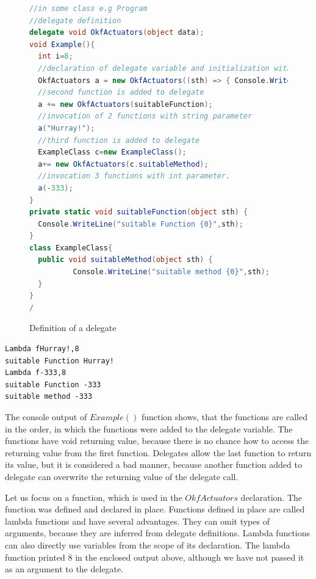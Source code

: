 \begin{figure}[!hbp]
\begin{lstlisting}[language=cs]
//in some class e.g Program
//delegate definition
delegate void OkfActuators(object data);
void Example(){
  int i=8;
  //declaration of delegate variable and initialization with lambda function
  OkfActuators a = new OkfActuators((sth) => { Console.WriteLine("Lambda f{0},{1}",sth,i); });
  //second function is added to delegate
  a += new OkfActuators(suitableFunction);
  //invocation of 2 functions with string parameter
  a("Hurray!");
  //third function is added to delegate
  ExampleClass c=new ExampleClass();
  a+= new OkfActuators(c.suitableMethod);
  //invocation 3 functions with int parameter.
  a(-333);
}
private static void suitableFunction(object sth) { 
  Console.WriteLine("suitable Function {0}",sth);
}
class ExampleClass{
  public void suitableMethod(object sth) { 	
          Console.WriteLine("suitable method {0}",sth);	
  }
}
/\end{lstlisting}
\caption{Definition of a delegate} \label{deleg}
\end{figure}

\begin{verbatim}
Lambda fHurray!,8
suitable Function Hurray!
Lambda f-333,8
suitable Function -333
suitable method -333
\end{verbatim}

  The console output of $Example()$ function shows, that the functions are called in the order, in
  which the functions were added to the delegate variable. 
  The functions have void returning value, because there is no chance how to access
  the returning value from the first function. Delegates allow the last function to return its value, 
  but it is considered a bad manner, because
  another function added to delegate can overwrite the returning value of the delegate call.

  Let us focus on a function, which is used in the $OkfActuators$ declaration. The function 
  was defined and declared in place. Functions defined in place are called lambda functions 
  and have several advantages. 
  They can omit types of arguments, because they are inferred from delegate definitions. Lambda functions
  can also directly use variables from the scope of its declaration. 
  The lambda function printed $8$ in the enclosed output above,
  although we have not passed it as an argument to the delegate.

